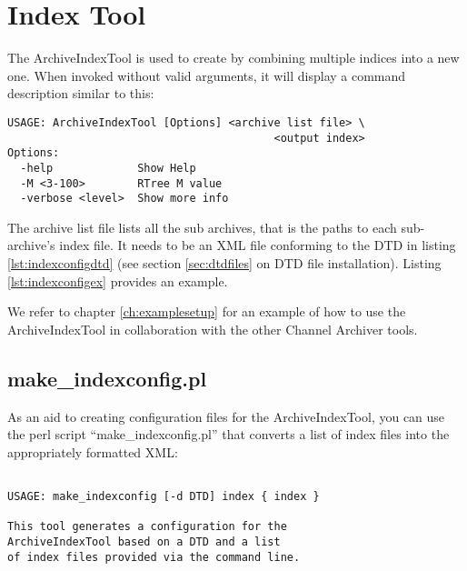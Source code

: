 \section{Index Tool} \label{sec:indextool}
The ArchiveIndexTool is used to create  by combining
multiple indices into a new one.  When invoked without valid
arguments, it will display a command description similar to this:

\begin{lstlisting}[frame=none,keywordstyle=\sffamily]
USAGE: ArchiveIndexTool [Options] <archive list file> \
                                         <output index> 
Options:
  -help             Show Help
  -M <3-100>        RTree M value
  -verbose <level>  Show more info
\end{lstlisting}

\noindent The archive list file lists all the sub archives,
that is the paths to each sub-archive's index file. It needs to be an
XML file conforming to the DTD in listing \ref{lst:indexconfigdtd}
(see section \ref{sec:dtdfiles} on DTD file installation).
Listing \ref{lst:indexconfigex} provides an example.





We refer to chapter \ref{ch:examplesetup} for an example of how to use
the ArchiveIndexTool in collaboration with the other Channel Archiver
tools.

\subsection{make\_indexconfig.pl} \label{sec:makeindexconfig}
As an aid to creating configuration files for the ArchiveIndexTool,
you can use the perl script ``make\_indexconfig.pl'' that converts a
list of index files into the appropriately formatted XML:
\begin{lstlisting}[frame=none,keywordstyle=\sffamily]

USAGE: make_indexconfig [-d DTD] index { index }
 
This tool generates a configuration for the
ArchiveIndexTool based on a DTD and a list
of index files provided via the command line.
\end{lstlisting}

